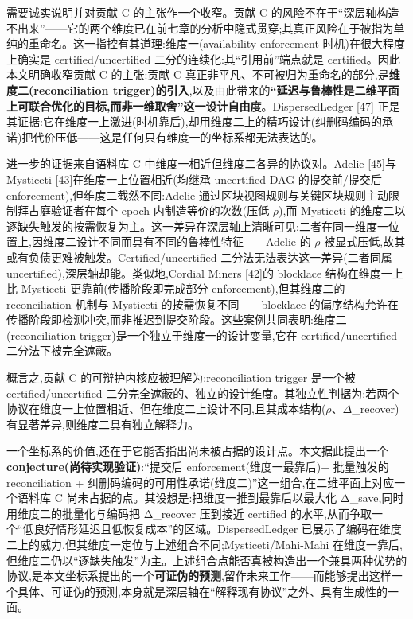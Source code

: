 \documentclass[UTF8,fontset=windows,a4paper,11pt]{ctexart}
\begin{document}
需要诚实说明并对贡献 C 的主张作一个收窄。贡献 C
的风险不在于``深层轴构造不出来''------它的两个维度已在前七章的分析中隐式贯穿;其真正风险在于被指为单纯的重命名。这一指控有其道理:维度一(availability-enforcement
时机)在很大程度上确实是 certified/uncertified
二分的连续化:其``引用前''端点就是 certified。因此本文明确收窄贡献 C
的主张:贡献 C
真正非平凡、不可被归为重命名的部分,是\textbf{维度二(reconciliation
trigger)的引入},以及由此带来的\textbf{``延迟与鲁棒性是二维平面上可联合优化的目标,而非一维取舍''这一设计自由度}。DispersedLedger
{[}47{]}
正是其证据:它在维度一上激进(时机靠后),却用维度二上的精巧设计(纠删码编码的承诺)把代价压低------这是任何只有维度一的坐标系都无法表达的。

进一步的证据来自语料库 C 中维度一相近但维度二各异的协议对。Adelie {[}45{]}与 Mysticeti {[}43{]}在维度一上位置相近(均继承 uncertified DAG 的提交前/提交后 enforcement),但维度二截然不同:Adelie 通过区块视图规则与关键区块规则主动限制拜占庭验证者在每个 epoch 内制造等价的次数(压低 $\rho$),而 Mysticeti 的维度二以逐缺失触发的按需恢复为主。这一差异在深层轴上清晰可见:二者在同一维度一位置上,因维度二设计不同而具有不同的鲁棒性特征------Adelie 的 $\rho$ 被显式压低,故其或有负债更难被触发。Certified/uncertified 二分法无法表达这一差异(二者同属 uncertified),深层轴却能。类似地,Cordial Miners {[}42{]}的 blocklace 结构在维度一上比 Mysticeti 更靠前(传播阶段即完成部分 enforcement),但其维度二的 reconciliation 机制与 Mysticeti 的按需恢复不同------blocklace 的偏序结构允许在传播阶段即检测冲突,而非推迟到提交阶段。这些案例共同表明:维度二(reconciliation trigger)是一个独立于维度一的设计变量,它在 certified/uncertified 二分法下被完全遮蔽。

概言之,贡献
C 的可辩护内核应被理解为:reconciliation trigger 是一个被
certified/uncertified 二分完全遮蔽的、独立的设计维度。其独立性判据为:若两个协议在维度一上位置相近、但在维度二上设计不同,且其成本结构($\rho$、$\Delta$\_recover)有显著差异,则维度二具有独立解释力。

一个坐标系的价值,还在于它能否指出尚未被占据的设计点。本文据此提出一个
\textbf{conjecture(尚待实现验证)}:``提交后 enforcement(维度一最靠后)+
批量触发的 reconciliation +
纠删码编码的可用性承诺(维度二)''这一组合,在二维平面上对应一个语料库 C
尚未占据的点。其设想是:把维度一推到最靠后以最大化
Δ\_save,同时用维度二的批量化与编码把 Δ\_recover 压到接近 certified
的水平,从而争取一个``低良好情形延迟且低恢复成本''的区域。DispersedLedger
已展示了编码在维度二上的威力,但其维度一定位与上述组合不同;Mysticeti/Mahi-Mahi
在维度一靠后,但维度二仍以``逐缺失触发''为主。上述组合点能否真被构造出一个兼具两种优势的协议,是本文坐标系提出的一个\textbf{可证伪的预测},留作未来工作------而能够提出这样一个具体、可证伪的预测,本身就是深层轴在``解释现有协议''之外、具有生成性的一面。
\end{document}
